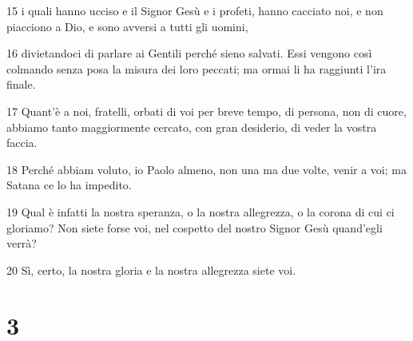 \par 15 i quali hanno ucciso e il Signor Gesù e i profeti, hanno cacciato noi, e non piacciono a Dio, e sono avversi a tutti gli uomini,
\par 16 divietandoci di parlare ai Gentili perché sieno salvati. Essi vengono così colmando senza posa la misura dei loro peccati; ma ormai li ha raggiunti l'ira finale.
\par 17 Quant'è a noi, fratelli, orbati di voi per breve tempo, di persona, non di cuore, abbiamo tanto maggiormente cercato, con gran desiderio, di veder la vostra faccia.
\par 18 Perché abbiam voluto, io Paolo almeno, non una ma due volte, venir a voi; ma Satana ce lo ha impedito.
\par 19 Qual è infatti la nostra speranza, o la nostra allegrezza, o la corona di cui ci gloriamo? Non siete forse voi, nel cospetto del nostro Signor Gesù quand'egli verrà?
\par 20 Sì, certo, la nostra gloria e la nostra allegrezza siete voi.

\chapter{3}

